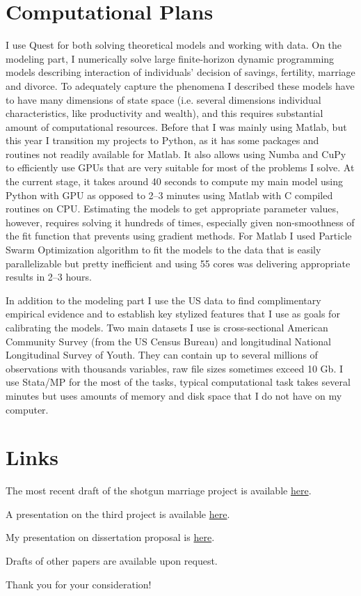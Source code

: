 \documentclass[12pt,letter]{article}
\begin{document}
\section*{Computational Plans}

I use Quest for both solving theoretical models and working with data. On the modeling part, I numerically solve large finite-horizon dynamic programming models describing interaction of individuals' decision of savings, fertility, marriage and divorce. To adequately capture the phenomena I described these models have to have many dimensions of state space (i.e. several dimensions individual characteristics, like productivity and wealth), and this requires substantial amount of computational resources. Before that I was mainly using Matlab, but this year I transition my projects to Python, as it has some packages and routines not readily available for Matlab. It also allows using Numba and CuPy to efficiently use GPUs that are very suitable for most of the problems I solve. At the current stage, it takes around 40 seconds to compute my main model using Python with GPU as opposed to 2--3 minutes using Matlab with C compiled routines on CPU. Estimating the models to get appropriate parameter values, however, requires solving it hundreds of times, especially given non-smoothness of the fit function that prevents using gradient methods. For Matlab I used Particle Swarm Optimization algorithm to fit the models to the data that is easily parallelizable but pretty inefficient and using 55 cores was delivering appropriate results in 2--3 hours.

In addition to the modeling part I use the US data to find complimentary empirical evidence and to establish key stylized features that I use as goals for calibrating the models. Two main datasets I use is cross-sectional American Community Survey (from the US Census Bureau) and longitudinal National Longitudinal Survey of Youth. They can contain up to several millions of observations with thousands variables, raw file sizes sometimes exceed 10 Gb. I use Stata/MP for the most of the tasks, typical computational task takes several minutes but uses amounts of memory and disk space that I do not have on my computer.

\section*{Links}

The most recent draft of the shotgun marriage project is available \href{https://drive.google.com/open?id=18fwM9vFx5Hq0Ghr9-vG9ETaQbWT7_uXq}{here}. 

A presentation on the third project is available \href{https://www.dropbox.com/s/r752m1oljk250os/springLunch.pdf}{here}.

My presentation on dissertation proposal is \href{https://www.dropbox.com/s/656nkkfvhjwzy4w/proposal.pdf}{here}.

Drafts of other papers are available upon request.





Thank you for your consideration!
\end{document}
